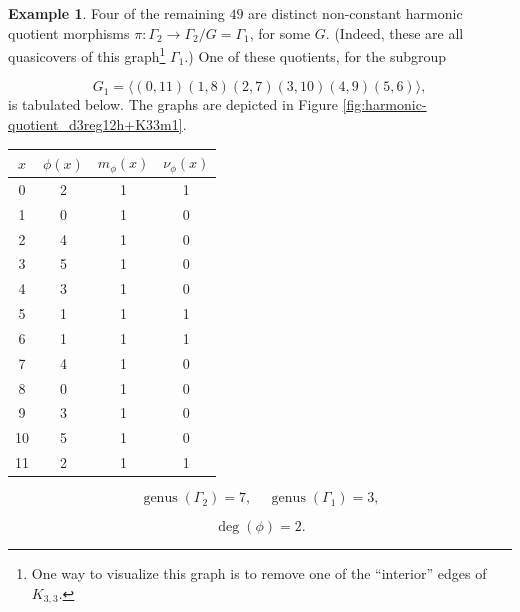 \documentclass[12pt,letterpaper]{article}
\theoremstyle{definition}
\newtheorem{example}[theorem]{Example}
\DeclareMathOperator{\genus}{genus}
\begin{document}
\begin{example}
{Four of the remaining $49$ are distinct non-constant harmonic quotient
morphisms $\pi: \Gamma_2\to \Gamma_2/G=\Gamma_1$, for some $G$.
(Indeed, these are all quasicovers of this
graph\footnote{One way to visualize this graph is to
remove one of the ``interior'' edges of $K_{3,3}$.}
$\Gamma_1$.)
One of these quotients, for the subgroup

\[
G_1=\langle (0,11)(1,8)(2,7)(3,10)(4,9)(5,6) \rangle,
\]
is tabulated below. The graphs are depicted in
Figure \ref{fig:harmonic-quotient_d3reg12h+K33m1}.

\begin{center}
\begin{tabular}{c|c|c|c}  
  $x$ & $\phi(x)$ & $m_\phi(x)$ & $\nu_\phi(x)$ \\ \hline
  0   &    2   &        1         &  1   \\ 
  1   &    0   &        1         &  0   \\ 
  2   &    4   &        1         &  0   \\ 
  3   &    5   &        1         &  0   \\ 
  4   &    3   &        1         &  0   \\ 
  5   &    1   &        1         &  1    \\ 
  6   &    1   &        1         &  1   \\ 
  7   &    4   &        1         &  0   \\
  8   &    0   &        1         &  0   \\
  9   &    3   &        1         &  0   \\
  10  &    5   &        1         &  0   \\
  11  &    2   &        1         &  1   \\ 
\end{tabular}
\end{center}

\[
  \genus(\Gamma_2) =7,\ \ \ \ \
  \genus(\Gamma_1) =3,
\]

\[
\deg(\phi) =2.
\]

}
\end{example}
\end{document}
